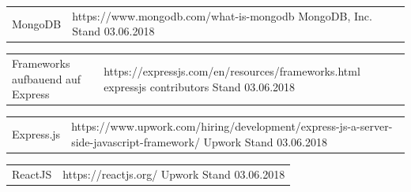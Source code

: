 \documentclass[12pt,a4paper]{report}
\begin{document}
\begin{thebibliography}{}
	
	\begin{tabular}[t]{p{6cm} p{10cm}}
		MongoDB & https://www.mongodb.com/what-is-mongodb
		\newline MongoDB, Inc.
		\newline Stand 03.06.2018\\	
	\end{tabular}
	
	\begin{tabular}[t]{p{6cm} p{10cm}}
		Frameworks aufbauend auf Express & https://expressjs.com/en/resources/frameworks.html
		\newline expressjs contributors
		\newline Stand 03.06.2018\\	
	\end{tabular}
	
	\begin{tabular}[t]{p{6cm} p{10cm}}
		Express.js & https://www.upwork.com/hiring/development/express-js-a-server-side-javascript-framework/
		\newline Upwork
		\newline Stand 03.06.2018\\	
	\end{tabular}

	\begin{tabular}[t]{p{6cm} p{10cm}}
		ReactJS & https://reactjs.org/
		\newline Upwork
		\newline Stand 03.06.2018\\	
	\end{tabular}

\end{thebibliography}


\end{document}
